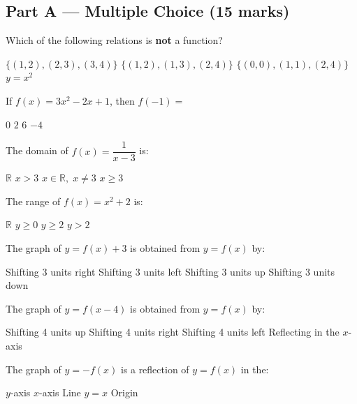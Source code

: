 \documentclass[addpoints]{exam}
\begin{document}
\newpage
\begin{questions}

\section*{Part A --- Multiple Choice (15 marks)}
\vspace{5mm}

\question[1] Which of the following relations is \textbf{not} a function?
\begin{choices}
    \choice $\{(1,2),(2,3),(3,4)\}$
    \correctchoice $\{(1,2),(1,3),(2,4)\}$
    \choice $\{(0,0),(1,1),(2,4)\}$
    \choice $y = x^2$
\end{choices}

\question[1] If $f(x) = 3x^2 - 2x + 1$, then $f(-1) =$
\begin{choices}
    \choice $0$
    \choice $2$
    \correctchoice $6$
    \choice $-4$
\end{choices}

\question[1] The domain of $f(x) = \dfrac{1}{x - 3}$ is:
\begin{choices}
    \choice $\mathbb{R}$
    \choice $x > 3$
    \correctchoice $x \in \mathbb{R},\; x \neq 3$
    \choice $x \geq 3$
\end{choices}

\question[1] The range of $f(x) = x^2 + 2$ is:
\begin{choices}
    \choice $\mathbb{R}$
    \choice $y \geq 0$
    \correctchoice $y \geq 2$
    \choice $y > 2$
\end{choices}

\question[1] The graph of $y = f(x) + 3$ is obtained from $y = f(x)$ by:
\begin{choices}
    \choice Shifting 3 units right
    \choice Shifting 3 units left
    \correctchoice Shifting 3 units up
    \choice Shifting 3 units down
\end{choices}

\question[1] The graph of $y = f(x - 4)$ is obtained from $y = f(x)$ by:
\begin{choices}
    \choice Shifting 4 units up
    \correctchoice Shifting 4 units right
    \choice Shifting 4 units left
    \choice Reflecting in the $x$-axis
\end{choices}

\question[1] The graph of $y = -f(x)$ is a reflection of $y = f(x)$ in the:
\begin{choices}
    \choice $y$-axis
    \correctchoice $x$-axis
    \choice Line $y = x$
    \choice Origin
\end{choices}


\end{questions}
\end{document}

